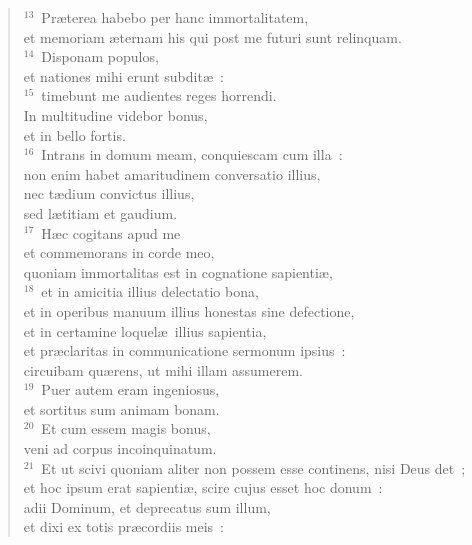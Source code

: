 \begin{verse}
${}^{13}$~Pr\ae terea habebo per hanc immortalitatem,\\ et memoriam \ae ternam his qui post me futuri sunt relinquam.\\
${}^{14}$~Disponam populos,\\ et nationes mihi erunt subdit\ae~:\\
${}^{15}$~timebunt me audientes reges horrendi.\\ In multitudine videbor bonus,\\ et in bello fortis.\\
${}^{16}$~Intrans in domum meam, conquiescam cum illa~:\\ non enim habet amaritudinem conversatio illius,\\ nec t\ae dium convictus illius,\\ sed l\ae titiam et gaudium.\\
${}^{17}$~H\ae c cogitans apud me\\ et commemorans in corde meo,\\ quoniam immortalitas est in cognatione sapienti\ae ,\\
${}^{18}$~et in amicitia illius delectatio bona,\\ et in operibus manuum illius honestas sine defectione,\\ et in certamine loquel\ae\ illius sapientia,\\ et pr\ae claritas in communicatione sermonum ipsius~:\\ circuibam qu\ae rens, ut mihi illam assumerem.\\
${}^{19}$~Puer autem eram ingeniosus,\\ et sortitus sum animam bonam.\\
${}^{20}$~Et cum essem magis bonus,\\ veni ad corpus incoinquinatum.\\
${}^{21}$~Et ut scivi quoniam aliter non possem esse continens, nisi Deus det~;\\ et hoc ipsum erat sapienti\ae , scire cujus esset hoc donum~:\\ adii Dominum, et deprecatus sum illum,\\ et dixi ex totis pr\ae cordiis meis~:\end{verse}


